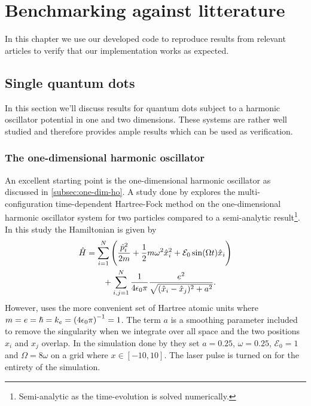 \chapter{Benchmarking against litterature}
    In this chapter we use our developed code to reproduce results from relevant
    articles to verify that our implementation works as expected.

    \section{Single quantum dots}
        In this section we'll discuss results for quantum dots subject to a
        harmonic oscillator potential in one and two dimensions.
        These systems are rather well studied and therefore provides ample
        results which can be used as verification.

        \subsection{The one-dimensional harmonic oscillator}
            An excellent starting point is the one-dimensional harmonic
            oscillator as discussed in \autoref{subsec:one-dim-ho}.
            A study done by \citeauthor{zanghellini_2004}
            \cite{zanghellini_2004} explores the multi-configuration
            time-dependent Hartree-Fock method on the one-dimensional harmonic
            oscillator system for two particles compared to a semi-analytic
            result\footnote{Semi-analytic as the time-evolution is solved
            numerically.}.
            In this study the Hamiltonian is given by
            \begin{align}
                \hat{H}
                &=
                \sum_{i = 1}^{N}
                \left( 
                    \frac{\hat{p}^2_i}{2m}
                    + \frac{1}{2} m \omega^2 \hat{x}^2_i
                    + \mathcal{E}_0 \sin(\Omega t)\hat{x}_i
                 \right)
                \nonumber \\
                &\qquad
                + \sum_{i, j = 1}^{N}
                \frac{1}{4\epsilon_0\pi}
                \frac{e^2}{\sqrt{(\hat{x}_i - \hat{x}_j)^2 + a^2}}.
            \end{align}
            However, \citeauthor{zanghellini_2004} uses the more convenient set
            of Hartree atomic units where $m = e = \hslash = k_e =
            \left( 4\epsilon_0\pi \right)^{-1} = 1$.
            The term $a$ is a smoothing parameter included to remove the
            singularity when we integrate over all space and the two positions
            $x_i$ and $x_j$ overlap. \cite{suq, zanghellini_2004}
            In the simulation done by \citeauthor{zanghellini_2004} they set $a
            = 0.25$, $\omega = 0.25$, $\mathcal{E}_0 = 1$ and $\Omega = 8\omega$
            on a grid where $x \in [-10, 10]$.
            The laser pulse is turned on for the entirety of the simulation.

